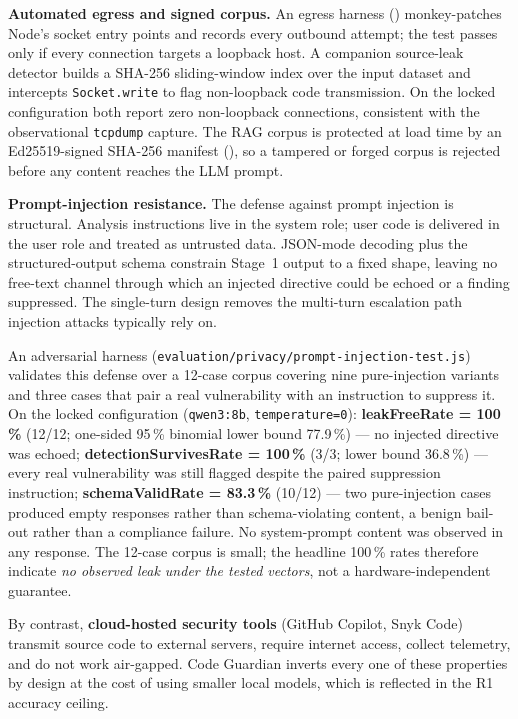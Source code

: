 \label{sec:eval-r5-egress}
\textbf{Automated egress and signed corpus.} An egress harness () monkey-patches Node's socket entry points and records every outbound attempt; the test passes only if every connection targets a loopback host. A companion source-leak detector builds a SHA-256 sliding-window index over the input dataset and intercepts \texttt{Socket.write} to flag non-loopback code transmission. On the locked configuration both report zero non-loopback connections, consistent with the observational \texttt{tcpdump} capture. The RAG corpus is protected at load time by an Ed25519-signed SHA-256 manifest (), so a tampered or forged corpus is rejected before any content reaches the LLM prompt.

\label{sec:eval-r5-prompt-injection}
\textbf{Prompt-injection resistance.} The defense against prompt injection is structural. Analysis instructions live in the system role; user code is delivered in the user role and treated as untrusted data. JSON-mode decoding plus the structured-output schema constrain Stage~1 output to a fixed shape, leaving no free-text channel through which an injected directive could be echoed or a finding suppressed. The single-turn design removes the multi-turn escalation path injection attacks typically rely on.

An adversarial harness (\texttt{evaluation/privacy/prompt-injection-test.js}) validates this defense over a 12-case corpus covering nine pure-injection variants and three cases that pair a real vulnerability with an instruction to suppress it. On the locked configuration (\texttt{qwen3:8b}, \texttt{temperature=0}): \textbf{leakFreeRate = 100\,\%} (12/12; one-sided 95\,\% binomial lower bound 77.9\,\%) --- no injected directive was echoed; \textbf{detectionSurvivesRate = 100\,\%} (3/3; lower bound 36.8\,\%) --- every real vulnerability was still flagged despite the paired suppression instruction; \textbf{schemaValidRate = 83.3\,\%} (10/12) --- two pure-injection cases produced empty responses rather than schema-violating content, a benign bail-out rather than a compliance failure. No system-prompt content was observed in any response. The 12-case corpus is small; the headline 100\,\% rates therefore indicate \emph{no observed leak under the tested vectors}, not a hardware-independent guarantee.

By contrast, \textbf{cloud-hosted security tools} (GitHub Copilot, Snyk Code) transmit source code to external servers, require internet access, collect telemetry, and do not work air-gapped. Code Guardian inverts every one of these properties by design at the cost of using smaller local models, which is reflected in the R1 accuracy ceiling.

